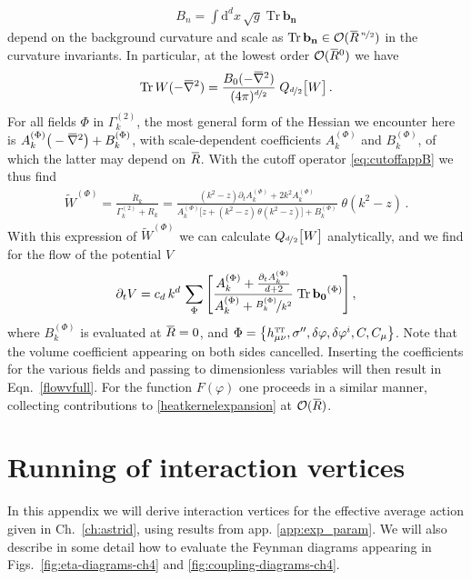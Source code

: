 \documentclass[11pt]{book}
\newcommand{\overbar}[1]{\mkern 1.5mu\overline{\mkern-1.5mu#1\mkern-1.5mu}\mkern 1.5mu}
\newcommand\TTspace{ -1pt }
\newcommand\hTTmunu{ h^{\scriptscriptstyle{\mathrm{T\hspace{\TTspace}T}}}_{\mu\nu} }
\newcommand{\bnabla}{\overbar \nabla}
\newcommand{\bR}{\overbar R}
\newcommand{\Tr}{\mathrm{Tr}}
\newcommand{\deltap}{\delta \varphi}
\numberwithin{equation}{chapter}
\begin{document}
\begin{appendices}
\begin{align}
  B_n = \int \mathrm d^dx \, \sqrt{g} \; \Tr \, \mathbf{b_n}
\end{align}
depend on the background curvature and scale as
$\Tr \, \mathbf{b_n} \in \mathcal O ( \bR^{\, \nicefrac n2 } )$
in the curvature invariants.
In particular, at the lowest order $\mathcal{O}(\bR^0)$ we have
\begin{align}
  \Tr \, W(-\bnabla^2) = \frac{B_0(-\bnabla^2)}{(4\pi)^{\nicefrac d2}} \; Q_{\nicefrac d2} \big[ W \big] \,.
\end{align}
For all fields $\Phi$ in $\Gamma_k^{(2)}$, the most general form of the Hessian we encounter here is
$A_k^{(\Phi)} \big(-\bnabla^2\big) + B_k^{(\Phi)}$,
with scale-dependent coefficients $A_k^{(\Phi)}$ and $B_k^{(\Phi)}$,
of which the latter may depend on $\bR$.
With the cutoff operator \eqref{eq:cutoffappB} we thus find
\begin{align}
  \tilde W^{(\Phi)} = \frac{ \dot R_k }{ \Gamma_k^{(2)} + R_k }
  = \frac{  (k^2-z) \partial_t A_k^{(\Phi)} + 2 k^2 A_k^{(\Phi)} }
  { A_k^{(\Phi)} \Big[ z+(k^2-z) \, \theta(k^2-z) \Big] + B_k^{(\Phi)} }
  \; \theta(k^2-z) \,.
\end{align}
With this expression of $\tilde W^{(\Phi)}$ we can calculate $Q_{\nicefrac d2} \big[ W \big]$
analytically, and we find for the flow of the potential $V$
\begin{align}
  \partial_t V = c_d \, k^d \, \sum_{\Phi}
  \Bigg[
    \frac{ A_k^{(\Phi)} + \frac{ \partial_t A_k^{(\Phi)} }{ d+2 } }
    { A_k^{(\Phi)} + \nicefrac{ B_k^{(\Phi)} }{ k^2 } } \; \Tr \, \mathbf{b_0}^{(\Phi)}
  \Bigg] \,,
\end{align}
where $B_k^{(\Phi)}$ is evaluated at $\bR=0$, and
$\Phi = \big\{ \hTTmunu, \sigma^{\prime\prime}, \deltap, \deltap^i, C, C_\mu \big\}$.
Note that the volume coefficient appearing on both sides cancelled.
Inserting the coefficients for the various fields and passing to dimensionless
variables will then result in Eqn.~\eqref{flowvfull}.
For the function $F(\varphi)$ one proceeds in a similar manner,
collecting contributions to \eqref{heatkernelexpansion} at $\mathcal O(\bR)$.


\chapter{Running of interaction vertices}
\label{app:EH}

In this appendix we will derive interaction vertices
for the effective average action given in Ch.~\ref{ch:astrid},
using results from app. \ref{app:exp_param}. We will also
describe in some detail how to evaluate the Feynman
diagrams appearing
in Figs.~\ref{fig:eta-diagrams-ch4}
and \ref{fig:coupling-diagrams-ch4}.


\end{appendices}
\end{document}
